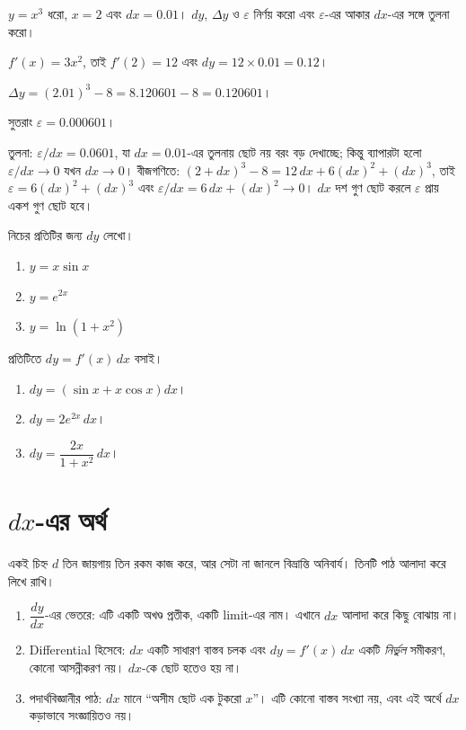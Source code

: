 \documentclass[11pt]{article}
\begin{document}
 $y = x^{3}$ ধরো, $x = 2$ এবং $dx = 0.01$। $dy$, $\Delta y$ ও
$\varepsilon$ নির্ণয় করো এবং $\varepsilon$-এর আকার $dx$-এর সঙ্গে তুলনা করো।

\begin{sol}
$f'(x) = 3x^{2}$, তাই $f'(2) = 12$ এবং $dy = 12 \times 0.01 = 0.12$।

$\Delta y = (2.01)^{3} - 8 = 8.120601 - 8 = 0.120601$।

সুতরাং $\varepsilon = 0.000601$।

তুলনা: $\varepsilon / dx = 0.0601$, যা $dx = 0.01$-এর তুলনায় ছোট নয় বরং
বড় দেখাচ্ছে; কিন্তু ব্যাপারটা হলো $\varepsilon/dx \to 0$ যখন $dx \to 0$।
বীজগণিতে: $(2+dx)^{3} - 8 = 12\,dx + 6(dx)^{2} + (dx)^{3}$, তাই
$\varepsilon = 6(dx)^{2} + (dx)^{3}$ এবং $\varepsilon/dx = 6\,dx + (dx)^{2}
\to 0$। $dx$ দশ গুণ ছোট করলে $\varepsilon$ প্রায় একশ গুণ ছোট হবে।
\end{sol}

 নিচের প্রতিটির জন্য $dy$ লেখো।
\begin{enumerate}
  \item $y = x\sin x$
  \item $y = e^{2x}$
  \item $y = \ln\left( 1+x^{2} \right)$
\end{enumerate}

\begin{sol}
প্রতিটিতে $dy = f'(x)\,dx$ বসাই।
\begin{enumerate}
  \item $dy = \left( \sin x + x\cos x \right)dx$।
  \item $dy = 2e^{2x}\,dx$।
  \item $dy = \dfrac{2x}{1+x^{2}}\,dx$।
\end{enumerate}
\end{sol}

\section{$dx$-এর অর্থ}

একই চিহ্ন $d$ তিন জায়গায় তিন রকম কাজ করে, আর সেটা না জানলে বিভ্রান্তি
অনিবার্য। তিনটি পাঠ আলাদা করে লিখে রাখি।

\begin{idea}[$d$-এর তিনটি পাঠ]
\begin{enumerate}
  \item $\dfrac{dy}{dx}$-এর ভেতরে: এটি একটি অখণ্ড প্রতীক, একটি limit-এর নাম।
        এখানে $dx$ আলাদা করে কিছু বোঝায় না।
  \item Differential হিসেবে: $dx$ একটি সাধারণ বাস্তব চলক এবং
        $dy = f'(x)\,dx$ একটি \emph{নির্ভুল} সমীকরণ, কোনো আসন্নীকরণ নয়।
        $dx$-কে ছোট হতেও হয় না।
  \item পদার্থবিজ্ঞানীর পাঠ: $dx$ মানে ``অসীম ছোট এক টুকরো $x$''। এটি কোনো
        বাস্তব সংখ্যা নয়, এবং এই অর্থে $dx$ কড়াভাবে সংজ্ঞায়িতও নয়।
\end{enumerate}
\end{idea}
\end{document}
